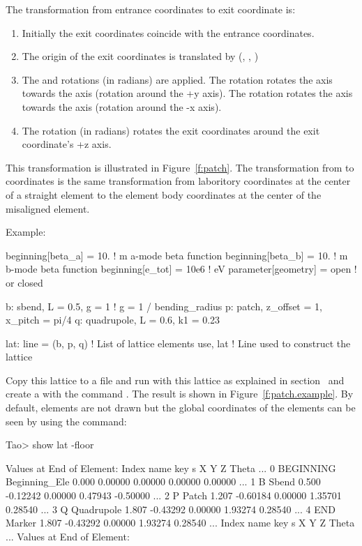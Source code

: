 \documentclass{hitec}
\begin{document}
The transformation from entrance coordinates to exit coordinate is:
\begin{enumerate}
\item Initially the exit coordinates coincide with the entrance coordinates.
\item The origin of the exit coordinates is translated by (, , )
\item The  and  rotations (in radians) are applied. 
The  rotation rotates the  axis
towards the  axis (rotation around the +y axis). The  rotation rotates the  axis
towards the  axis (rotation around the -x axis).
\item The  rotation (in radians) rotates the exit coordinates around the exit coordinate's +z
axis.
\end{enumerate}
This transformation is illustrated in Figure~\ref{f:patch}. The transformation from 
 to  coordinates is the same transformation from laboritory coordinates at the
center of a straight element to the element body coordinates at the center of the misaligned
element.

Example:
\begin{code}
beginning[beta_a] = 10.   ! m  a-mode beta function
beginning[beta_b] = 10.   ! m  b-mode beta function
beginning[e_tot] = 10e6   ! eV
parameter[geometry] = open  ! or closed

b: sbend, L = 0.5, g = 1    ! g = 1 / bending_radius
p: patch, z_offset = 1, x_pitch = pi/4
q: quadrupole, L = 0.6, k1 = 0.23

lat: line = (b, p, q)   ! List of lattice elements
use, lat                ! Line used to construct the lattice
\end{code}

Copy this lattice to a file and run \tao with this lattice as explained in
section~ and create a  with the command 
. The result is shown in Figure~\ref{f:patch.example}.
By default,  elements are not drawn but the global coordinates
of the elements can be seen by using the  command:
\begin{code}
Tao> show lat -floor

      Values at End of Element:
 Index  name      key               s           X           Y           Z       Theta ...
     0  BEGINNING Beginning_Ele  0.000     0.00000     0.00000     0.00000     0.00000 ...
     1  B         Sbend          0.500    -0.12242     0.00000     0.47943    -0.50000 ...
     2  P         Patch          1.207    -0.60184     0.00000     1.35701     0.28540 ...
     3  Q         Quadrupole     1.807    -0.43292     0.00000     1.93274     0.28540 ...
     4  END       Marker         1.807    -0.43292     0.00000     1.93274     0.28540 ...
 Index  name      key                s           X           Y           Z       Theta ...
      Values at End of Element:
\end{code}
\end{document}
